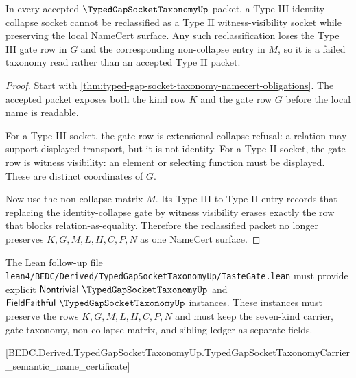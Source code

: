 \begin{theorem}
\label{thm:typed-gap-socket-taxonomy-noncollapse-prediction}
In every accepted $\TypedGapSocketTaxonomyUp$ packet, a Type III identity-collapse socket cannot be reclassified as a Type II witness-visibility socket while preserving the local NameCert surface. Any such reclassification loses the Type III gate row in $G$ and the corresponding non-collapse entry in $M$, so it is a failed taxonomy read rather than an accepted Type II packet.
\end{theorem}
\begin{proof}
Start with \autoref{thm:typed-gap-socket-taxonomy-namecert-obligations}. The accepted packet exposes both the kind row $K$ and the gate row $G$ before the local name is readable.

For a Type III socket, the gate row is extensional-collapse refusal: a relation may support displayed transport, but it is not identity. For a Type II socket, the gate row is witness visibility: an element or selecting function must be displayed. These are distinct coordinates of $G$.

Now use the non-collapse matrix $M$. Its Type III-to-Type II entry records that replacing the identity-collapse gate by witness visibility erases exactly the row that blocks relation-as-equality. Therefore the reclassified packet no longer preserves $K,G,M,L,H,C,P,N$ as one NameCert surface.
\end{proof}

The Lean follow-up file \texttt{lean4/BEDC/Derived/TypedGapSocketTaxonomyUp/TasteGate.lean} must provide explicit $\mathsf{Nontrivial}\ \TypedGapSocketTaxonomyUp$ and $\mathsf{FieldFaithful}\ \TypedGapSocketTaxonomyUp$ instances. These instances must preserve the rows $K,G,M,L,H,C,P,N$ and must keep the seven-kind carrier, gate taxonomy, non-collapse matrix, and sibling ledger as separate fields.

[BEDC.Derived.TypedGapSocketTaxonomyUp.TypedGapSocketTaxonomyCarrier\_semantic\_name\_certificate]

